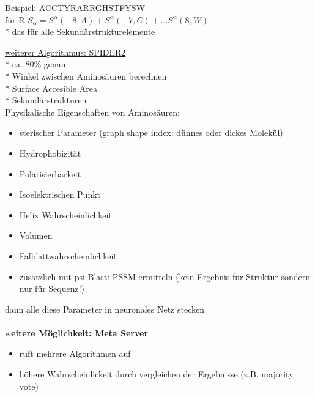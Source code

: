 Beispiel: ACCTYRAR\underline{R}GHSTFYSW\\
für R
$S_{\alpha}=S^{\alpha}(-8,A) + S^{\alpha}(-7,C) + ... S^{\alpha}(8,W)$\\
 * das für alle Sekundärstrukturelemente

\underline{weiterer Algorithmus: SPIDER2}\\
 * ca. 80\% genau\\
 * Winkel zwischen Aminosäuren berechnen\\
 * Surface Accesible Area\\
 * Sekundärstrukturen\\

Physikalische Eigenschaften von Aminosäuren:\\
\begin{itemize}
	\item sterischer Parameter (graph shape index: dünnes oder dickes Molekül)
	\item Hydrophobizität
	\item Polarisierbarkeit
	\item Isoelektrischen Punkt
	\item Helix Wahrscheinlichkeit
	\item Volumen
	\item Falblattwahrscheinlichkeit
	\item zusätzlich mit psi-Blast: PSSM ermitteln (kein Ergebnis für Struktur sondern nur für Sequenz!)
\end{itemize}
%
dann alle diese Parameter in neuronales Netz stecken
\\\\
w\textbf{eitere Möglichkeit: Meta Server}\\
\begin{itemize}
	\item ruft mehrere Algorithmen auf
	\item höhere Wahrscheinlickeit durch vergleichen der Ergebnisse (z.B. majority vote)
\end{itemize}